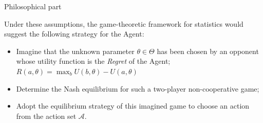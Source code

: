 \documentclass{beamer}
\theoremstyle{definition}
\begin{document}
\begin{frame}{Philosophical part}

Under these assumptions, the game-theoretic framework for statistics would suggest the following strategy for the Agent:

\begin{itemize}
    \item Imagine that the unknown parameter $\theta \in \Theta$ has been chosen by an opponent whose utility function is the \emph{Regret} of the Agent; $R(a,\theta) = \max_{b} U(b,\theta)-U(a,\theta)$
    \item Determine the Nash equilibrium for such a two-player non-cooperative game;
    \item Adopt the equilibrium strategy of this imagined game to choose an action from the action set $\mathcal{A}$.
\end{itemize}

\end{frame}
\end{document}
